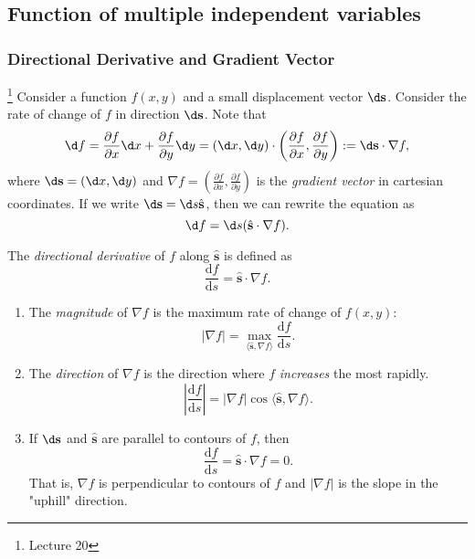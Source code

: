 \documentclass[a4paper]{article}
\begin{document}
    \subsection{Function of multiple independent variables}
    \subsubsection{Directional Derivative and Gradient Vector}\footnote{Lecture 20}
    Consider a function $f(x,y)$ and a small displacement vector $ \d \mathbf{s} $. Consider the rate of change of $f$ in direction $ \d \mathbf{s} $. Note that 
    \[
        \d f = \frac{\partial f}{\partial x}\d x+ \frac{\partial f}{\partial y}\d y = (\d x,\d y) \cdot \left( \frac{\partial f}{\partial x} ,\frac{\partial f}{\partial y}\right):=\d\mathbf{s} \cdot \nabla f,
    \]
    where $ \d \mathbf{s}=(\d x,\d y) $ and $ \nabla f = \left( \frac{\partial f}{\partial x} ,\frac{\partial f}{\partial y}\right) $ is the \textit{gradient vector} in cartesian coordinates. If we write $ \d \mathbf{s}=\d s \hat{\mathbf{s}} $, then we can rewrite the equation as 
    \[
        \d f = \d s (\hat{\mathbf{s}}\cdot \nabla f).
    \]
    \begin{definition}
        The \textit{directional derivative} of $f$ along $\hat{\mathbf{s}}$ is defined as 
        \[
            \frac{\mathrm{d}f}{\mathrm{d}s} = \hat{\mathbf{s}} \cdot \nabla f. 
        \]
    \end{definition}
    \begin{proposition}\label{prop:properties of gradient vector}
        \begin{enumerate}
            \item The \textit{magnitude} of $\nabla f$ is the maximum rate of change of $f(x,y)$:
            \[
                \left| \nabla f \right| = \max_{\langle \hat{\mathbf{s}}, \nabla f \rangle } \frac{\mathrm{d}f}{\mathrm{d}s}. 
            \]
            \item The \textit{direction} of $\nabla f$ is the direction where $f$ \textit{increases} the most rapidly.
            \[
                \left| \frac{\mathrm{d}f}{\mathrm{d}s}  \right| = \left| \nabla f\right| \cos \langle \hat{\mathbf{s}},\nabla f \rangle.
            \]
            \item If $ \d \mathbf{s} $ and $\hat{\mathbf{s}}$ are parallel to contours of $f$, then 
            \[
                \frac{\mathrm{d}f}{\mathrm{d}s}=\hat{\mathbf{s}} \cdot \nabla f=0. 
            \]
            That is, $ \nabla f $ is perpendicular to contours of $f$ and $ |\nabla f| $ is the slope in the "uphill" direction.
        \end{enumerate}
    \end{proposition}
\end{document}
